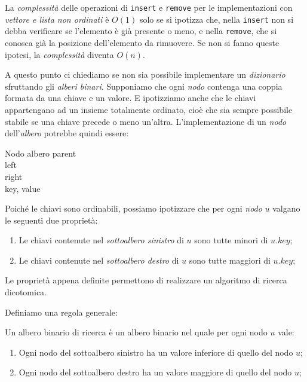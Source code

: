 \begin{note}
    La \emph{complessità} delle operazioni di \texttt{insert} e \texttt{remove}
    per le implementazioni con \emph{vettore e lista non ordinati} è $O(1)$
    solo se si ipotizza che, nella \texttt{insert} non si debba verificare se
    l'elemento è già presente o meno, e nella \texttt{remove}, che si conosca
    già la posizione dell'elemento da rimuovere. Se non si fanno queste
    ipotesi, la \emph{complessità} diventa $O(n)$.
\end{note}\noindent
A questo punto ci chiediamo se non sia possibile implementare un \emph{dizionario}
sfruttando gli \emph{alberi binari}. Supponiamo che ogni \emph{nodo}
contenga una coppia formata da una chiave e un valore. E ipotizziamo anche che
le chiavi appartengano ad un insieme totalmente ordinato, cioè che sia sempre
possibile stabile se una chiave precede o meno un'altra.
L'implementazione di un \emph{nodo} dell'\emph{albero} potrebbe quindi essere:
\begin{code}{Nodo albero}
     parent\\
     left\\
     right\\
     key, value
\end{code}\noindent
Poiché le chiavi sono ordinabili, possiamo ipotizzare che per ogni \emph{nodo}
$u$ valgano le seguenti due proprietà:
\begin{enumerate}
    \item Le chiavi contenute nel \emph{sottoalbero sinistro} di $u$ sono
    tutte minori di $u.key$;
    \item Le chiavi contenute nel \emph{sottoalbero destro} di $u$ sono
    tutte maggiori di $u.key$;
\end{enumerate}\newpage
\begin{note}
    Le proprietà appena definite permettono di realizzare un algoritmo di
    ricerca dicotomica.
\end{note}\noindent
Definiamo una regola generale:\
\begin{definition}
    Un albero binario di ricerca è un albero binario nel quale per ogni nodo $u$
    vale:
    \begin{enumerate}
        \item Ogni nodo del sottoalbero sinistro ha un valore inferiore di quello
        del nodo $u$;
        \item Ogni nodo del sottoalbero destro ha un valore maggiore di quello
        del nodo $u$;
    \end{enumerate}
\end{definition}

